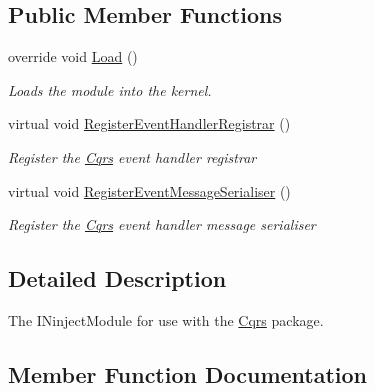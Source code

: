 \subsection*{Public Member Functions}
\begin{DoxyCompactItemize}
\item 
override void \hyperlink{classCqrs_1_1Azure_1_1EventHub_1_1EventBus_1_1Configuration_1_1AzureEventBusReceiverModule_a8cd868f04408a45e25b9fde785dabf7f}{Load} ()
\begin{DoxyCompactList}\small\item\em Loads the module into the kernel. \end{DoxyCompactList}\item 
virtual void \hyperlink{classCqrs_1_1Azure_1_1EventHub_1_1EventBus_1_1Configuration_1_1AzureEventBusReceiverModule_ad170174fa51db720544ead9fcd74ecea}{Register\+Event\+Handler\+Registrar} ()
\begin{DoxyCompactList}\small\item\em Register the \hyperlink{namespaceCqrs}{Cqrs} event handler registrar \end{DoxyCompactList}\item 
virtual void \hyperlink{classCqrs_1_1Azure_1_1EventHub_1_1EventBus_1_1Configuration_1_1AzureEventBusReceiverModule_aa66b1894a9647b338a0a3a809c5f270f}{Register\+Event\+Message\+Serialiser} ()
\begin{DoxyCompactList}\small\item\em Register the \hyperlink{namespaceCqrs}{Cqrs} event handler message serialiser \end{DoxyCompactList}\end{DoxyCompactItemize}


\subsection{Detailed Description}
The I\+Ninject\+Module for use with the \hyperlink{namespaceCqrs}{Cqrs} package. 



\subsection{Member Function Documentation}
\mbox{\label{classCqrs_1_1Azure_1_1EventHub_1_1EventBus_1_1Configuration_1_1AzureEventBusReceiverModule_a8cd868f04408a45e25b9fde785dabf7f}} 
